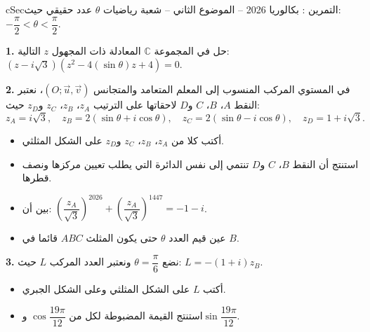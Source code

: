 \documentclass[12pt,a4paper]{article}
\newenvironment{BOX}[2]{\begin{otherlanguage}{english}\begin{arbox}{#1}{#2}}{\end{arbox}\end{otherlanguage}}
\newcounter{exo}
\newenvironment{tamrin}[1]{\stepcounter{exo}\begin{BOX}{cSec}{التمرين \theexo: #1}}{\end{BOX}}
\newenvironment{sq}{\begin{itemize}[leftmargin=2.4em,itemsep=3pt]}{\end{itemize}}
\newcommand{\qa}{\item[(أ)]}\newcommand{\qb}{\item[(ب)]}\newcommand{\qc}{\item[(جـ)]}\newcommand{\qd}{\item[(د)]}\newcommand{\qe}{\item[(هـ)]}
\newcommand{\QQ}[1]{\par\smallskip\textbf{#1.} }
\begin{document}
\begin{tamrin}{بكالوريا 2026 -- الموضوع الثاني -- شعبة رياضيات}
$\theta$ عدد حقيقي حيث: $-\dfrac{\pi}{2}<\theta<\dfrac{\pi}{2}$.

\QQ{1} حل في المجموعة $\mathbb{C}$ المعادلة ذات المجهول $z$ التالية: $\left(z-i\sqrt3\right)\left(z^2-4(\sin\theta)z+4\right)=0$.

\QQ{2} في المستوي المركب المنسوب إلى المعلم المتعامد والمتجانس $\left(O;\vec u,\vec v\right)$، نعتبر النقط $A$، $B$، $C$ و$D$ لاحقاتها على الترتيب $z_A$، $z_B$، $z_C$ و$z_D$ حيث:
\[z_A=i\sqrt3,\quad z_B=2(\sin\theta+i\cos\theta),\quad z_C=2(\sin\theta-i\cos\theta),\quad z_D=1+i\sqrt3.\]
\begin{sq}
\qa أكتب كلا من $z_A$، $z_B$، $z_C$ و$z_D$ على الشكل المثلثي.
\qb استنتج أن النقط $B$، $C$ و$D$ تنتمي إلى نفس الدائرة التي يطلب تعيين مركزها ونصف قطرها.
\qc بين أن: $\left(\dfrac{z_A}{\sqrt3}\right)^{2026}+\left(\dfrac{z_A}{\sqrt3}\right)^{1447}=-1-i$.
\qd عين قيم العدد $\theta$ حتى يكون المثلث $ABC$ قائما في $B$.
\end{sq}
\QQ{3} نضع $\theta=\dfrac{\pi}{6}$ ونعتبر العدد المركب $L$ حيث: $L=-(1+i)z_B$.
\begin{sq}
\qa أكتب $L$ على الشكل المثلثي وعلى الشكل الجبري.
\qb استنتج القيمة المضبوطة لكل من $\cos\dfrac{19\pi}{12}$ و$\sin\dfrac{19\pi}{12}$.
\end{sq}
\end{tamrin}
\end{document}
